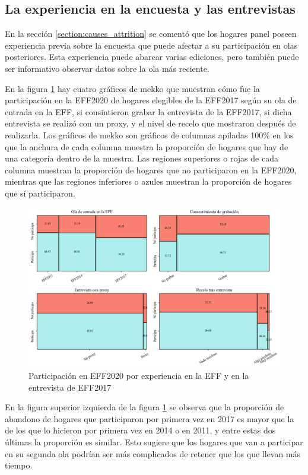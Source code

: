 \subsection*{La experiencia en la encuesta y las entrevistas}

En la sección \ref{section:causes_attrition} se comentó que los hogares panel poseen experiencia previa sobre la encuesta que puede afectar a su participación en olas posteriores. Esta experiencia puede abarcar varias ediciones, pero también puede ser informativo observar datos sobre la ola más reciente.

En la figura \ref{fig:fig1} hay cuatro gráficos de mekko que muestran cómo fue la participación en la EFF2020 de hogares elegibles de la EFF2017 según su ola de entrada en la EFF, si consintieron grabar la entrevista de la EFF2017, si dicha entrevista se realizó con un proxy, y el nivel de recelo que mostraron después de realizarla. Los gráficos de mekko son gráficos de columnas apiladas 100\% en los que la anchura de cada columna muestra la proporción de hogares que hay de una categoría dentro de la muestra. Las regiones superiores o rojas de cada columna muestran la proporción de hogares que no participaron en la EFF2020, mientras que las regiones inferiores o azules muestran la proporción de hogares que sí participaron.

\begin{figure}[ht]
	\centering
	\includegraphics[width=1\textwidth]{figs/figure1.png}
	\caption{Participación en EFF2020 por experiencia en la EFF y en la entrevista de EFF2017}
	\label{fig:fig1}
\end{figure}

En la figura superior izquierda de la figura \ref{fig:fig1} se observa que la proporción de abandono de hogares que participaron por primera vez en 2017 es mayor que la de los que lo hicieron por primera vez en 2014 o en 2011, y entre estas dos últimas la proporción es similar. Esto sugiere que los hogares que van a participar en su segunda ola podrían ser más complicados de retener que los que llevan más tiempo. 

